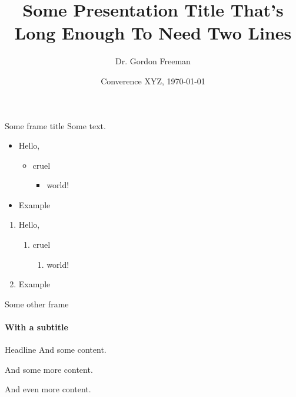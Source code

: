 \documentclass[t]{beamer}
\title{Some Presentation Title That's Long Enough To Need Two Lines}
\date[\today]{Converence XYZ, \today}
\author[Freeman]{Dr. Gordon Freeman}
\begin{document}
\begin{frame}
\titlepage
\end{frame}

\begin{frame}{Some frame title}
Some text.
\begin{itemize}
  \item Hello,
    \begin{itemize}
      \item cruel
        \begin{itemize}
          \item world!
        \end{itemize}
    \end{itemize}
    \item Example
\end{itemize}

\begin{enumerate}
  \item Hello,
    \begin{enumerate}
      \item cruel
        \begin{enumerate}
          \item world!
        \end{enumerate}
    \end{enumerate}
  \item Example
\end{enumerate}

\end{frame}


\begin{frame}{Some other frame}
\framesubtitle{With a subtitle}
\begin{block}{Headline}
And some content.

And some more content.

And even more content.
\end{block}
\end{frame}
\end{document}
